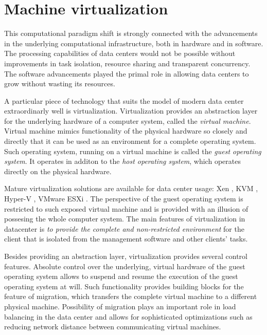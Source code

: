 \section{Machine virtualization}

This computational paradigm shift is strongly connected with the advancements 
in the underlying computational infrastructure, both in hardware and in software. 
The processing capabilities of data centers 
would not be possible without improvements in
task isolation, resource sharing and transparent concurrency.
The software advancements played the
primal role in allowing data centers to grow without wasting its resources.

A particular piece of technology that suits the model of modern data center extraordinarly well is virtualization.
Virtualization provides an abstraction layer for the underlying hardware of a computer system, called the \emph{virtual machine}.
Virtual machine mimics functionality of the physical hardware so closely and
directly that it can be used as an environment for a complete operating system.
Such operating system, running on a virtual machine is called the \emph{guest
operating system}. It operates in additon to the \emph{host operating
system}, which operates directly on the physical hardware. 

Mature virtualization solutions are available for data center usage: Xen
\cite{url-xen}, KVM \cite{url-kvm}, Hyper-V \cite{url-hyperv}, VMware ESXi
\cite{url-vmware}. The perspective of the guest
operating system is restricted to such exposed virtual machine and is provided
with an illusion of possesing the whole computer system. The main features of
virtualization in datacenter is \emph{to provide the complete and
non-restricted environment} for the client that is isolated from the management
software and other clients' tasks.

Besides providing an abstraction layer, virtualization provides several
control features. Absolute control over the underlying, virtual hardware of
the guest operating system allows to suspend and resume the execution of the
guest operating system at will. Such functionality provides building blocks
for the feature of migration, which transfers the complete virtual machine to
a different physical machine. Possibility of migration plays an important role
in load balancing in the data center and allows for sophisticated
optimizations such as reducing network distance between communicating virtual
machines.


